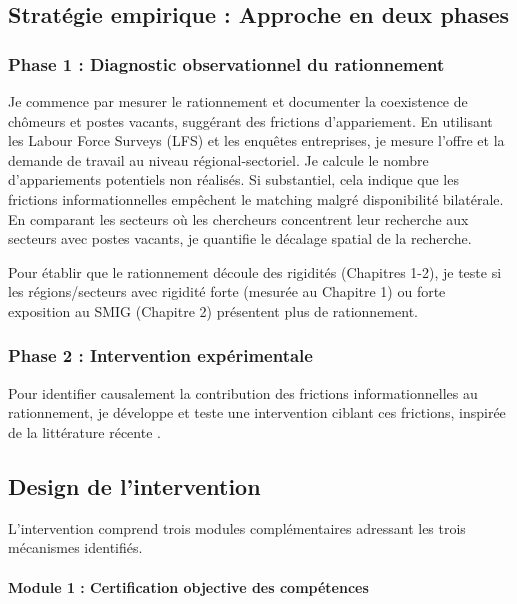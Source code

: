 \documentclass[12pt,a4paper]{article}
\begin{document}
\subsection{Stratégie empirique : Approche en deux phases}

\subsubsection{Phase 1 : Diagnostic observationnel du rationnement}

Je commence par mesurer le rationnement et documenter la coexistence de chômeurs et postes vacants, suggérant des frictions d'appariement. En utilisant les Labour Force Surveys (LFS) et les enquêtes entreprises, je mesure l'offre et la demande de travail au niveau régional-sectoriel. Je calcule le nombre d'appariements potentiels non réalisés. Si substantiel, cela indique que les frictions informationnelles empêchent le matching malgré disponibilité bilatérale. En comparant les secteurs où les chercheurs concentrent leur recherche aux secteurs avec postes vacants, je quantifie le décalage spatial de la recherche.

Pour établir que le rationnement découle des rigidités (Chapitres 1-2), je teste si les régions/secteurs avec rigidité forte (mesurée au Chapitre 1) ou forte exposition au SMIG (Chapitre 2) présentent plus de rationnement.

\subsubsection{Phase 2 : Intervention expérimentale}

Pour identifier causalement la contribution des frictions informationnelles au rationnement, je développe et teste une intervention ciblant ces frictions, inspirée de la littérature récente \citep{carranza2022, fernando2023}.

\subsection{Design de l'intervention}

L'intervention comprend trois modules complémentaires adressant les trois mécanismes identifiés.

\paragraph{Module 1 : Certification objective des compétences}
\end{document}
